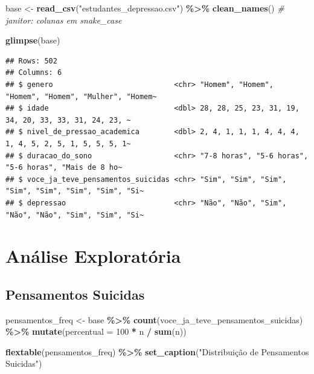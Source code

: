 \documentclass[
]{article}
\newenvironment{Shaded}{\begin{snugshade}}{\end{snugshade}}
\newcommand{\AttributeTok}[1]{\textcolor[rgb]{0.13,0.29,0.53}{#1}}
\newcommand{\CommentTok}[1]{\textcolor[rgb]{0.56,0.35,0.01}{\textit{#1}}}
\newcommand{\DecValTok}[1]{\textcolor[rgb]{0.00,0.00,0.81}{#1}}
\newcommand{\FunctionTok}[1]{\textcolor[rgb]{0.13,0.29,0.53}{\textbf{#1}}}
\newcommand{\NormalTok}[1]{#1}
\newcommand{\OtherTok}[1]{\textcolor[rgb]{0.56,0.35,0.01}{#1}}
\newcommand{\SpecialCharTok}[1]{\textcolor[rgb]{0.81,0.36,0.00}{\textbf{#1}}}
\newcommand{\StringTok}[1]{\textcolor[rgb]{0.31,0.60,0.02}{#1}}
\begin{document}
\begin{Shaded}
\begin{Highlighting}[]
\NormalTok{base }\OtherTok{\textless{}{-}} \FunctionTok{read\_csv}\NormalTok{(}\StringTok{"estudantes\_depressao.csv"}\NormalTok{) }\SpecialCharTok{\%\textgreater{}\%}
  \FunctionTok{clean\_names}\NormalTok{() }\CommentTok{\# janitor: colunas em snake\_case}

\FunctionTok{glimpse}\NormalTok{(base)}
\end{Highlighting}
\end{Shaded}

\begin{verbatim}
## Rows: 502
## Columns: 6
## $ genero                            <chr> "Homem", "Homem", "Homem", "Homem", "Mulher", "Homem~
## $ idade                             <dbl> 28, 28, 25, 23, 31, 19, 34, 20, 33, 33, 31, 24, 23, ~
## $ nivel_de_pressao_academica        <dbl> 2, 4, 1, 1, 1, 4, 4, 4, 1, 4, 5, 2, 5, 1, 5, 5, 5, 1~
## $ duracao_do_sono                   <chr> "7-8 horas", "5-6 horas", "5-6 horas", "Mais de 8 ho~
## $ voce_ja_teve_pensamentos_suicidas <chr> "Sim", "Sim", "Sim", "Sim", "Sim", "Sim", "Sim", "Si~
## $ depressao                         <chr> "Não", "Não", "Sim", "Não", "Não", "Sim", "Sim", "Si~
\end{verbatim}

\section{Análise Exploratória}\label{eda}

\subsection{Pensamentos Suicidas}\label{pensamentos-suicidas}

\begin{Shaded}
\begin{Highlighting}[]
\NormalTok{pensamentos\_freq }\OtherTok{\textless{}{-}}\NormalTok{ base }\SpecialCharTok{\%\textgreater{}\%}
  \FunctionTok{count}\NormalTok{(voce\_ja\_teve\_pensamentos\_suicidas) }\SpecialCharTok{\%\textgreater{}\%}
  \FunctionTok{mutate}\NormalTok{(}\AttributeTok{percentual =} \DecValTok{100} \SpecialCharTok{*}\NormalTok{ n }\SpecialCharTok{/} \FunctionTok{sum}\NormalTok{(n))}

\FunctionTok{flextable}\NormalTok{(pensamentos\_freq) }\SpecialCharTok{\%\textgreater{}\%}
  \FunctionTok{set\_caption}\NormalTok{(}\StringTok{"Distribuição de Pensamentos Suicidas"}\NormalTok{)}
\end{Highlighting}
\end{Shaded}
\end{document}

